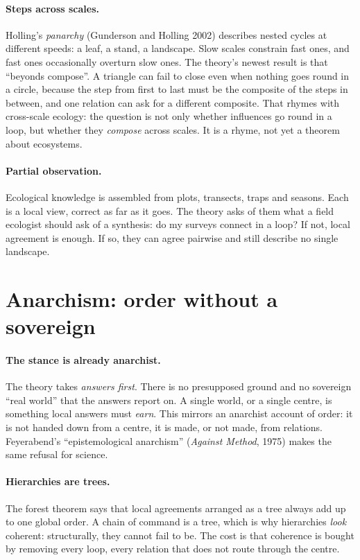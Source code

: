 \documentclass[11pt]{article}
\begin{document}
\paragraph{Steps across scales.} Holling's \emph{panarchy} (Gunderson and
Holling 2002) describes nested cycles at different speeds: a leaf, a stand, a
landscape. Slow scales constrain fast ones, and fast ones occasionally overturn
slow ones. The theory's newest result is that ``beyonds compose''. A triangle can
fail to close even when nothing goes round in a circle, because the step from
first to last must be the composite of the steps in between, and one relation
can ask for a different composite. That rhymes with cross-scale ecology: the
question is not only whether influences go round in a loop, but whether they
\emph{compose} across scales. It is a rhyme, not yet a theorem about ecosystems.

\paragraph{Partial observation.} Ecological knowledge is assembled from plots,
transects, traps and seasons. Each is a local view, correct as far as it goes.
The theory asks of them what a field ecologist should ask of a synthesis: do my
surveys connect in a loop? If not, local agreement is enough. If so, they can
agree pairwise and still describe no single landscape.

\section{Anarchism: order without a sovereign}
\paragraph{The stance is already anarchist.} The theory takes \emph{answers
first}. There is no presupposed ground and no sovereign ``real world'' that the
answers report on. A single world, or a single centre, is something local
answers must \emph{earn}. This mirrors an anarchist account of order: it is not
handed down from a centre, it is made, or not made, from relations.
Feyerabend's ``epistemological anarchism'' (\emph{Against Method}, 1975) makes
the same refusal for science.

\paragraph{Hierarchies are trees.} The forest theorem says that local agreements
arranged as a tree always add up to one global order. A chain of command is a
tree, which is why hierarchies \emph{look} coherent: structurally, they cannot
fail to be. The cost is that coherence is bought by removing every loop, every
relation that does not route through the centre.
\end{document}
